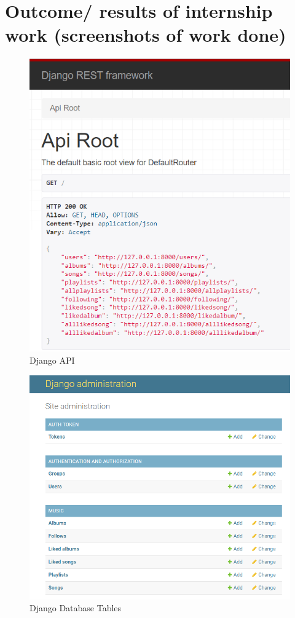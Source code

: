 \documentclass[a4paper, 12pt]{article}
\begin{document}
\newpage

\section{Outcome/ results of internship work (screenshots of work done)}
\begin{figure}[h]
    \centering
    \includegraphics[scale=1.0,frame]{django result.png}
    \caption{Django API}
\end{figure}
\begin{figure}
    \centering
    \includegraphics[scale=0.70,frame]{django models.png}
    \caption{Django Database Tables}
\end{figure} 
\end{document}
